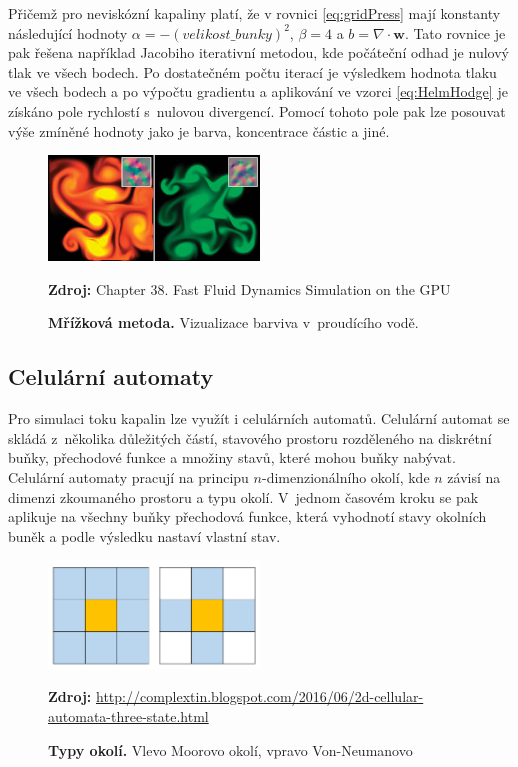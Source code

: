 Přičemž pro neviskózní kapaliny platí, že v rovnici \ref{eq:gridPress} mají konstanty následující hodnoty $\alpha = -( velikost\_bunky )^2$, $\beta = 4$ a $b = \nabla \cdot \mathbf{w}$. Tato rovnice je pak řešena například Jacobiho iterativní metodou, kde počáteční odhad je nulový tlak ve všech bodech. Po dostatečném počtu iterací je výsledkem hodnota tlaku ve všech bodech a po výpočtu gradientu a aplikování ve vzorci \ref{eq:HelmHodge} je získáno pole rychlostí s~nulovou divergencí. Pomocí tohoto pole pak lze posouvat výše zmíněné hodnoty jako je barva, koncentrace částic a jiné.
\cite{GPUGemsGridFLuid}

\begin{figure}[hbt]
	\centering
	\captionsetup{justification=centering}
	\includegraphics[width=0.5\textwidth]{obrazky-figures/GridFluid.jpg}
	\caption{\textbf{Mřížková metoda.} Vizualizace barviva v~proudícího vodě.}
	\textbf{Zdroj: } Chapter 38. Fast Fluid Dynamics Simulation on the GPU \cite{GPUGemsGridFLuid}
	\label{fig:EulerFluid}
\end{figure}

\subsection{Celulární automaty}
Pro simulaci toku kapalin lze využít i celulárních automatů. Celulární automat se skládá z~několika důležitých částí, stavového prostoru rozděleného na diskrétní buňky, přechodové funkce a množiny stavů, které mohou buňky nabývat. Celulární automaty pracují na principu $n$-dimenzionálního okolí, kde $n$ závisí na dimenzi zkoumaného prostoru a typu okolí. V~jednom časovém kroku se pak aplikuje na všechny buňky přechodová funkce, která vyhodnotí stavy okolních buněk a podle výsledku nastaví vlastní stav.

\begin{figure}[hbt]
	\centering
	\captionsetup{justification=centering}
	\includegraphics[width=0.5\textwidth]{obrazky-figures/Neighborhood.png}
	\caption{\textbf{Typy okolí.} Vlevo Moorovo okolí, vpravo Von-Neumanovo}
	\textbf{Zdroj: } \url{http://complextin.blogspot.com/2016/06/2d-cellular-automata-three-state.html}
	\label{fig:neighbours}
\end{figure}

